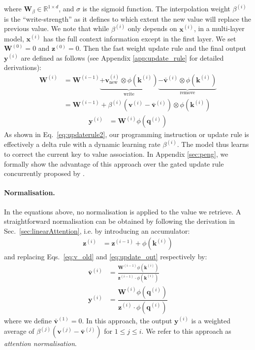 \documentclass{article}
\def\vk{{\bm{k}}}
\def\vq{{\bm{q}}}
\def\vv{{\bm{v}}}
\def\vx{{\bm{x}}}
\def\vy{{\bm{y}}}
\def\vz{{\bm{z}}}
\def\mW{{\bm{W}}}
\newcommand{\sigmoid}{\sigma}
\theoremstyle{definition}
\begin{document}
where $\mW_\beta \in \mathbb{R}^{1 \times d}$, and $\sigmoid$ is the sigmoid function. 
The interpolation weight $\beta^{(i)}$  is the ``write-strength'' as it defines to which extent the new value will replace the previous value.
We note that while $\beta^{(i)}$ only depends on $\vx^{(i)}$,
in a multi-layer model, $\vx^{(i)}$ has the full context information except in
the first layer.
We set $\mW^{(0)}=0$ and $\vz^{(0)}=0$.
Then the fast weight update rule and the final output $\vy^{(i)}$ are defined as follows (see Appendix \ref{app:update_rule} for detailed derivations):
\begin{align}
\label{eq:updaterule}
\mW^{(i)} &= \mW^{(i-1)}
    \underbrace{+ \vv^{(i)}_\text{new} \otimes \phi(\vk^{(i)})}_{\text{write}}
    \underbrace{- \bar{\vv}^{(i)} \otimes \phi(\vk^{(i)})}_{\text{remove}} \\
&= \mW^{(i-1)} + \beta^{(i)}(\vv^{(i)} - \bar{\vv}^{(i)}) \otimes \phi(\vk^{(i)})  \label{eq:updaterule2}
\end{align}
\begin{align}
\vy^{(i)}  &= \mW^{(i)} \phi(\vq^{(i)}) \label{eq:update_out}
\end{align}
As shown in Eq.~\ref{eq:updaterule2}, our programming
instruction or update rule is effectively a delta rule
with a dynamic learning rate $\beta^{(i)}$.
The model thus learns to correct the current
key to value association.
In Appendix \ref{sec:peng}, we formally show
the advantage of this approach over the 
gated update rule concurrently proposed by \citet{peng2021random}.

\paragraph{Normalisation.}
In the equations above, no normalisation is applied to the value we retrieve.
A straightforward normalisation can be obtained by following the derivation in Sec.~\ref{sec:linearAttention}, i.e. by introducing an accumulator:
\begin{align}
\vz^{(i)} &= \vz^{(i-1)} + \phi(\vk^{(i)}) \label{eq:acc}
\end{align}
and replacing Eqs.~\ref{eq:v_old} and \ref{eq:update_out} respectively by:
\begin{align}
\bar{\vv}^{(i)} &= \frac{\mW^{(i-1)} \phi(\vk^{(i)})}{\vz^{(i-1)} \cdot \phi(\vk^{(i)})} \\
\vy^{(i)}  &= \displaystyle \dfrac{\mW^{(i)} \phi(\vq^{(i)})}{\vz^{(i)} \cdot \phi(\vq^{(i)})} 
\end{align}
where we define $\bar{\vv}^{(1)}=0$.
In this approach, the output $\vy^{(i)}$ is a weighted average of $\beta^{(j)}(\vv^{(j)} - \bar{\vv}^{(j)})$ for $1\leq j \leq i$.
We refer to this approach as \textit{attention normalisation}.
\end{document}
